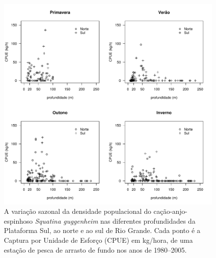 \documentclass[a4paper,11pt,twoside,showtrims,onecolumn,openright,final]{memoir}
\begin{document}
%
%

\begin{figure}
\begin{center}
\includegraphics[width=\textwidth]{Guggenheim_CPUExProfTrimestres}
\end{center}
\caption[Variação sazonal da densidade populacional do cação-anjo-espinhoso \emph{Squatina guggenheim}]
	{A variação sazonal da densidade populacional do cação-anjo-espinhoso \emph{Squatina guggenheim} 
	 nas diferentes profundidades da Plataforma Sul, ao norte e ao sul de Rio Grande. 
	 Cada ponto é a Captura por Unidade de Esforço (CPUE) em kg/hora, de uma 
	 estação de pesca de arrasto de fundo nos anos de  1980--2005.}
\label{fig:guggenheim-cpueportrimestre}
\end{figure}


%
%
\end{document}
